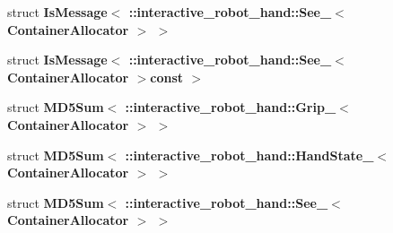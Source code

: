 \begin{DoxyCompactItemize}
\item 
struct {\bf Is\-Message$<$ \-::interactive\-\_\-robot\-\_\-hand\-::\-See\-\_\-$<$ Container\-Allocator $>$ $>$}
\item 
struct {\bf Is\-Message$<$ \-::interactive\-\_\-robot\-\_\-hand\-::\-See\-\_\-$<$ Container\-Allocator $>$const  $>$}
\item 
struct {\bf M\-D5\-Sum$<$ \-::interactive\-\_\-robot\-\_\-hand\-::\-Grip\-\_\-$<$ Container\-Allocator $>$ $>$}
\item 
struct {\bf M\-D5\-Sum$<$ \-::interactive\-\_\-robot\-\_\-hand\-::\-Hand\-State\-\_\-$<$ Container\-Allocator $>$ $>$}
\item 
struct {\bf M\-D5\-Sum$<$ \-::interactive\-\_\-robot\-\_\-hand\-::\-See\-\_\-$<$ Container\-Allocator $>$ $>$}
\end{DoxyCompactItemize}

